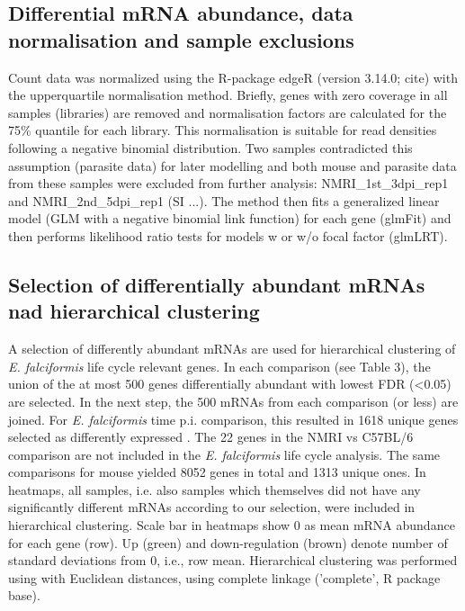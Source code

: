 \documentclass{bmcart}
\begin{document}
\subsection{Differential mRNA abundance, data normalisation and sample exclusions}
Count data was normalized using the R-package edgeR (version 3.14.0;
cite) with the upperquartile normalisation method. Briefly, genes with
zero coverage in all samples (libraries) are removed and normalisation
factors are calculated for the 75\% quantile for each library. This
normalisation is suitable for read densities following a negative
binomial distribution. Two samples contradicted this assumption
(parasite data) for later modelling and both mouse and parasite data
from these samples were excluded from further analysis:
NMRI\_1st\_3dpi\_rep1 and NMRI\_2nd\_5dpi\_rep1 (SI ...). The method
then fits a generalized linear model (GLM with a negative binomial
link function) for each gene (glmFit) and then performs likelihood
ratio tests for models w or w/o focal factor (glmLRT).


\subsection{Selection of differentially abundant mRNAs nad hierarchical clustering}
A selection of differently abundant mRNAs are used for hierarchical
clustering of \textit{E. falciformis} life cycle relevant genes. In
each comparison (see Table 3), the union of the at most 500 genes
differentially abundant with lowest FDR (<0.05) are selected. In the
next step, the 500 mRNAs from each comparison (or less) are
joined. For \textit{E. falciformis} time p.i. comparison, this
resulted in 1618 unique genes selected as differently expressed . The
22 genes in the NMRI vs C57BL/6 comparison are not included in the
\textit{E. falciformis} life cycle analysis. The same comparisons for
mouse yielded 8052 genes in total and 1313 unique ones. In heatmaps,
all samples, i.e. also samples which themselves did not have any
significantly different mRNAs according to our selection, were
included in hierarchical clustering. Scale bar in heatmaps show 0 as
mean mRNA abundance for each gene (row). Up (green) and
down-regulation (brown) denote number of standard deviations from 0,
i.e., row mean. Hierarchical clustering was performed using with
Euclidean distances, using complete linkage ('complete', R package
base).
\end{document}
